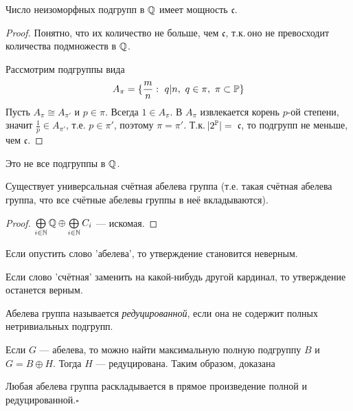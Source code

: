 \documentclass[10pt,a4paper]{article}%
\begin{document}
\begin{theorem}Число неизоморфных подгрупп в $\mathbb Q$ имеет мощность
$\mathfrak{c}$.
\end{theorem}

\begin{proof} Понятно, что их количество не больше, чем $\mathfrak{c}$,
т.к.\,оно не превосходит количества подмножеств в $\mathbb Q$.

Рассмотрим подгруппы вида
$$
A_\pi=\{\frac{m}{n}:~q|n,~q\in\pi,~\pi\subset \mathbb P\}
$$
Пусть $A_\pi\cong A_{\pi'}$ и $p\in\pi$. Всегда $1\in A_\pi$. В
$A_\pi$ извлекается корень $p$-ой степени, значит $\frac{1}{p}\in
A_{\pi'}$, т.е. $p\in\pi'$, поэтому $\pi=\pi'$. Т.к.\,$|2^\mathbb P|=\,$
$\mathfrak{c}$, то подгрупп не меньше, чем
$\mathfrak{c}$.\end{proof}

\begin{remark}
Это не все подгруппы в $\mathbb Q$.
\end{remark}

\begin{theorem}Существует
универсальная счётная абелева группа (т.е. такая счётная абелева группа, что все
счётные абелевы группы в неё вкладываются).
\end{theorem}

\begin{proof}
$\bigoplus\limits_{i\in\mathbb N}\mathbb Q\oplus\bigoplus\limits_{i\in\mathbb N}C_i$
--- искомая.\end{proof}

\begin{remark}
Если опустить слово 'абелева', то утверждение становится неверным.
\end{remark}

\begin{remark}
Если слово 'счётная' заменить на какой-нибудь другой кардинал, то
утверждение останется верным.
\end{remark}

Абелева группа называется {\em
редуцированной}, если она не
содержит полных нетривиальных подгрупп.

Если $G$ --- абелева, то можно найти максимальную полную подгруппу
$B$ и $G=B\oplus H$. Тогда $H$ --- редуцирована. Таким образом,
доказана

\begin{theorem}Любая абелева группа раскладывается в
прямое произведение полной и редуцированной.$\square$
\end{theorem}
\end{document}
